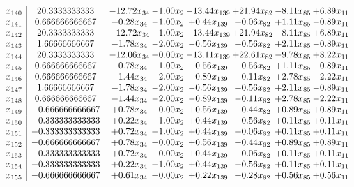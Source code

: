 \documentclass[8pt]{article}
\begin{document}
\[\begin{array}{c| c c@{\hskip 2pt} c@{\hskip 2pt} c@{\hskip 2pt} c@{\hskip 2pt} c@{\hskip 2pt} c@{\hskip 2pt} }
 x_{140}   &  20.3333333333 & -12.72 x_{34} & -1.00 x_{2} & -13.44 x_{139} & + 21.94 x_{82} & -8.11 x_{85} & +  6.89 x_{11}\\
 x_{141}   &  0.666666666667 & -0.28 x_{34} & -1.00 x_{2} & +  0.44 x_{139} & +  0.06 x_{82} & +  1.11 x_{85} & -0.89 x_{11}\\
 x_{142}   &  20.3333333333 & -12.72 x_{34} & -1.00 x_{2} & -13.44 x_{139} & + 21.94 x_{82} & -8.11 x_{85} & +  6.89 x_{11}\\
 x_{143}   &  1.66666666667 & -1.78 x_{34} & -2.00 x_{2} & -0.56 x_{139} & +  0.56 x_{82} & +  2.11 x_{85} & -0.89 x_{11}\\
 x_{144}   &  20.3333333333 & -12.06 x_{34} & +  0.00 x_{2} & -13.11 x_{139} & + 22.61 x_{82} & -9.78 x_{85} & +  8.22 x_{11}\\
 x_{145}   &  0.666666666667 & -0.78 x_{34} & -1.00 x_{2} & -0.56 x_{139} & +  0.56 x_{82} & +  1.11 x_{85} & -0.89 x_{11}\\
 x_{146}   &  0.666666666667 & -1.44 x_{34} & -2.00 x_{2} & -0.89 x_{139} & -0.11 x_{82} & +  2.78 x_{85} & -2.22 x_{11}\\
 x_{147}   &  1.66666666667 & -1.78 x_{34} & -2.00 x_{2} & -0.56 x_{139} & +  0.56 x_{82} & +  2.11 x_{85} & -0.89 x_{11}\\
 x_{148}   &  0.666666666667 & -1.44 x_{34} & -2.00 x_{2} & -0.89 x_{139} & -0.11 x_{82} & +  2.78 x_{85} & -2.22 x_{11}\\
 x_{149}   &  -0.666666666667 & +  0.78 x_{34} & +  0.00 x_{2} & +  0.56 x_{139} & +  0.44 x_{82} & +  0.89 x_{85} & +  0.89 x_{11}\\
 x_{150}   &  -0.333333333333 & +  0.22 x_{34} & +  1.00 x_{2} & +  0.44 x_{139} & +  0.56 x_{82} & +  0.11 x_{85} & +  0.11 x_{11}\\
 x_{151}   &  -0.333333333333 & +  0.72 x_{34} & +  1.00 x_{2} & +  0.44 x_{139} & +  0.06 x_{82} & +  0.11 x_{85} & +  0.11 x_{11}\\
 x_{152}   &  -0.666666666667 & +  0.78 x_{34} & +  0.00 x_{2} & +  0.56 x_{139} & +  0.44 x_{82} & +  0.89 x_{85} & +  0.89 x_{11}\\
 x_{153}   &  -0.333333333333 & +  0.72 x_{34} & +  0.00 x_{2} & +  0.44 x_{139} & +  0.06 x_{82} & +  0.11 x_{85} & +  0.11 x_{11}\\
 x_{154}   &  -0.333333333333 & +  0.22 x_{34} & +  1.00 x_{2} & +  0.44 x_{139} & +  0.56 x_{82} & +  0.11 x_{85} & +  0.11 x_{11}\\
 x_{155}   &  -0.666666666667 & +  0.61 x_{34} & +  0.00 x_{2} & +  0.22 x_{139} & +  0.28 x_{82} & +  0.56 x_{85} & +  0.56 x_{11}\\

\end{array}\]
\end{document}
